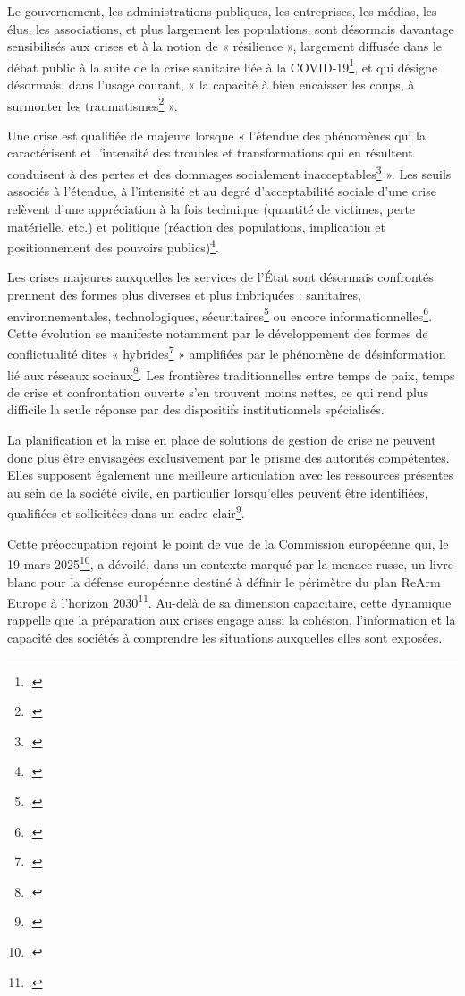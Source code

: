 Le gouvernement, les administrations publiques, les entreprises, les médias, les élus, les associations, et plus largement les populations, sont désormais davantage sensibilisés aux crises et à la notion de « résilience », largement diffusée dans le débat public à la suite de la crise sanitaire liée à la COVID-19\footcite{Paries2020_resilience_covid19}, et qui désigne désormais, dans l'usage courant, « la capacité à bien encaisser les coups, à surmonter les traumatismes\footcite[1]{Paries2020_resilience_covid19} ».

Une crise est qualifiée de majeure lorsque « l'étendue des phénomènes qui la caractérisent et l'intensité des troubles et transformations qui en résultent conduisent à des pertes et des dommages socialement inacceptables\footcite{info_pompiers_crise_majeure_def} ». Les seuils associés à l'étendue, à l'intensité et au degré d'acceptabilité sociale d'une crise relèvent d'une appréciation à la fois technique (quantité de victimes, perte matérielle, etc.) et politique (réaction des populations, implication et positionnement des pouvoirs publics)\footcite{info_pompiers_crise_majeure_def}.

Les crises majeures auxquelles les services de l'État sont désormais confrontés prennent des formes plus diverses et plus imbriquées : sanitaires, environnementales, technologiques, sécuritaires\footcite{AN:2022:Resilience_nationale} ou encore informationnelles\footcite[3]{SciencesPo:2025:Resilience_menaces_informationnelles}.
Cette évolution se manifeste notamment par le développement des formes de conflictualité dites « hybrides\footcite{tenenbaum2016guerre} » amplifiées par le phénomène de désinformation lié aux réseaux sociaux\footcite{garrigou2025desinformation}. Les frontières traditionnelles entre temps de paix, temps de crise et confrontation ouverte s'en trouvent moins nettes, ce qui rend plus difficile la seule réponse par des dispositifs institutionnels spécialisés.

La planification et la mise en place de solutions de gestion de crise ne peuvent donc plus être envisagées exclusivement par le prisme des autorités compétentes. Elles supposent également une meilleure articulation avec les ressources présentes au sein de la société civile, en particulier lorsqu'elles peuvent être identifiées, qualifiées et sollicitées dans un cadre clair\footcite{AN:2022:Resilience_nationale}.

Cette préoccupation rejoint le point de vue de la Commission européenne qui, le 19 mars 2025\footcite{burgdorff2025livreblanc}, a dévoilé, dans un contexte marqué par la menace russe, un livre blanc pour la défense européenne destiné à définir le périmètre du plan ReArm Europe à l'horizon 2030\footcite{viepublique2025livreblanc}. Au-delà de sa dimension capacitaire, cette dynamique rappelle que la préparation aux crises engage aussi la cohésion, l'information et la capacité des sociétés à comprendre les situations auxquelles elles sont exposées.

